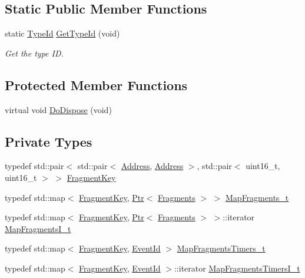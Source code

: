 \subsection*{Static Public Member Functions}
\begin{DoxyCompactItemize}
\item 
static \hyperlink{classns3_1_1TypeId}{Type\+Id} \hyperlink{classns3_1_1SixLowPanNetDevice_a744728b84055111218b43824c598e30c}{Get\+Type\+Id} (void)
\begin{DoxyCompactList}\small\item\em Get the type ID. \end{DoxyCompactList}\end{DoxyCompactItemize}
\subsection*{Protected Member Functions}
\begin{DoxyCompactItemize}
\item 
virtual void \hyperlink{classns3_1_1SixLowPanNetDevice_aa012326b671b8a0c95a2b98dc022d680}{Do\+Dispose} (void)
\end{DoxyCompactItemize}
\subsection*{Private Types}
\begin{DoxyCompactItemize}
\item 
typedef std\+::pair$<$ std\+::pair$<$ \hyperlink{classns3_1_1Address}{Address}, \hyperlink{classns3_1_1Address}{Address} $>$, std\+::pair$<$ uint16\+\_\+t, uint16\+\_\+t $>$ $>$ \hyperlink{classns3_1_1SixLowPanNetDevice_a8e3be88fc6596428b23fb7b220f8e148}{Fragment\+Key}
\item 
typedef std\+::map$<$ \hyperlink{classns3_1_1SixLowPanNetDevice_a8e3be88fc6596428b23fb7b220f8e148}{Fragment\+Key}, \hyperlink{classns3_1_1Ptr}{Ptr}$<$ \hyperlink{classns3_1_1SixLowPanNetDevice_1_1Fragments}{Fragments} $>$ $>$ \hyperlink{classns3_1_1SixLowPanNetDevice_a382cbc481f6663c889485dfa63f6c5c3}{Map\+Fragments\+\_\+t}
\item 
typedef std\+::map$<$ \hyperlink{classns3_1_1SixLowPanNetDevice_a8e3be88fc6596428b23fb7b220f8e148}{Fragment\+Key}, \hyperlink{classns3_1_1Ptr}{Ptr}$<$ \hyperlink{classns3_1_1SixLowPanNetDevice_1_1Fragments}{Fragments} $>$ $>$\+::iterator \hyperlink{classns3_1_1SixLowPanNetDevice_a3705ab28794ee87035b79632b7657603}{Map\+Fragments\+I\+\_\+t}
\item 
typedef std\+::map$<$ \hyperlink{classns3_1_1SixLowPanNetDevice_a8e3be88fc6596428b23fb7b220f8e148}{Fragment\+Key}, \hyperlink{classns3_1_1EventId}{Event\+Id} $>$ \hyperlink{classns3_1_1SixLowPanNetDevice_a18f45002cd987a2b49d9c155e21d99b7}{Map\+Fragments\+Timers\+\_\+t}
\item 
typedef std\+::map$<$ \hyperlink{classns3_1_1SixLowPanNetDevice_a8e3be88fc6596428b23fb7b220f8e148}{Fragment\+Key}, \hyperlink{classns3_1_1EventId}{Event\+Id} $>$\+::iterator \hyperlink{classns3_1_1SixLowPanNetDevice_a13a491d7e33f4ffa15205baf6d393ec1}{Map\+Fragments\+Timers\+I\+\_\+t}
\end{DoxyCompactItemize}
